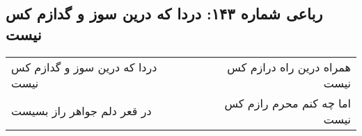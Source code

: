 \begin{center}
\section*{رباعی شماره ۱۴۳: دردا که درین سوز و گدازم کس نیست}
\label{sec:sh143}
\begin{longtable}{l p{0.5cm} r}
دردا که درین سوز و گدازم کس نیست
&&
همراه درین راه درازم کس نیست
\\
در قعر دلم جواهر راز بسیست
&&
اما چه کنم محرم رازم کس نیست
\\
\end{longtable}
\end{center}
